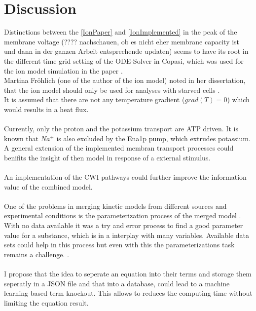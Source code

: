 \section{Discussion}
Distinctions between the \ref{IonPaper} and \ref{IonImplemented} in the peak of the membrane voltage (???? nachschauen, ob es nicht eher membrane capacity ist und dann in der ganzen Arbeit entsprechende updaten) seems to have its root in the different time grid setting of the ODE-Solver in Copasi, which was used for the ion model simulation in the paper \cite{Gerber_2016}.\\
Martina Fröhlich (one of the author of the ion model) noted in her dissertation, that the ion model should only be used for analyses with starved cells \cite{martinafroehlich}.\\
It is assumed that there are not any temperature gradient ($grad(T)=0$) which would results in a heat flux.\\\\
Currently, only the proton and the potassium transport are ATP driven. It is known that $Na^+$ is also excluded by the Ena1p pump, which extrudes potassium. A general extension of the implemented membran transport processes could benifits the insight of then model in response of a external stimulus.\\\\
An implementation of the CWI pathways could further improve the information value of the combined model.\\\\
One of the problems in merging kinetic models from different sources and experimental conditions is the parameterization process of the merged model \cite{Wang2017}. With no data available it was a try and error process to find a good parameter value for a substance, which is in a interplay with many variables. Available data sets could help in this process but even with this the parameterizations task remains a challenge. \cite{Ke_2013}. \\\\
I propose that the idea to seperate an equation into their terms and storage them seperatly in a JSON file and that into a database, could lead to a machine learning based term knockout. This allows to reduces the computing time without limiting the equation result.\\

